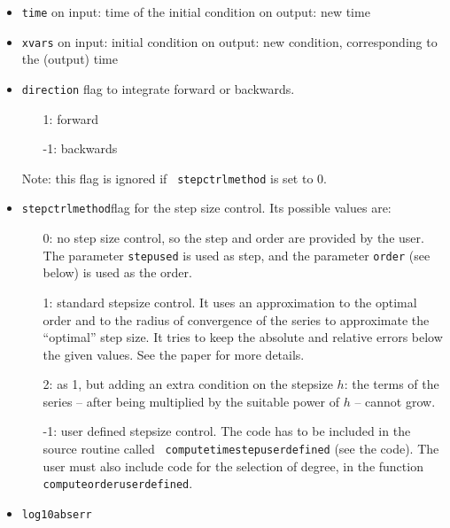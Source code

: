 \documentclass[10pt]{article}
\theoremstyle{remark}
\begin{document}
\begin{itemize}
\item {\tt time}\newline
  on input:  time of the initial condition\newline
  on output: new time
\item {\tt xvars}\newline
  on input:  initial condition\newline
  on output: new condition, corresponding to the (output) time
\item {\tt direction}\newline
  flag to integrate forward or backwards.
  \begin{itemize}
  \item[\phantom{-}1:] forward
  \item[-1:] backwards
  \end{itemize}
  Note: this flag is ignored if {\tt
    stepctrlmethod} is set to 0.
\item {\tt stepctrlmethod}\newline flag for the
  step size control. Its possible values are:
  \begin{itemize}
  \item[\phantom{-}0:] no step size control, so the step and order are
    provided by the user. The parameter \verb+stepused+ is used as
    step, and the parameter \verb+order+ (see below) is used as the
    order.
  \item[\phantom{-}1:] standard stepsize control. It uses an
    approximation to the optimal order and to the radius of
    convergence of the series to approximate the ``optimal'' step
    size. It tries to keep the absolute and relative errors below the
    given values. See the paper \cite{JZ} for more details.
  \item[\phantom{-}2:] as 1, but adding an extra condition on the
    stepsize $h$: the terms of the series -- after being multiplied by
    the suitable power of $h$ -- cannot grow.
  \item[-1:] user defined stepsize control. The code has to be
    included in the source routine called {\tt
      computetimestepuserdefined}
    (see the code). The user must also include code for the selection
    of degree, in the function {\tt
      computeorderuserdefined}.
  \end{itemize}
\item {\tt log10abserr}\newline

\end{itemize}
\end{document}
